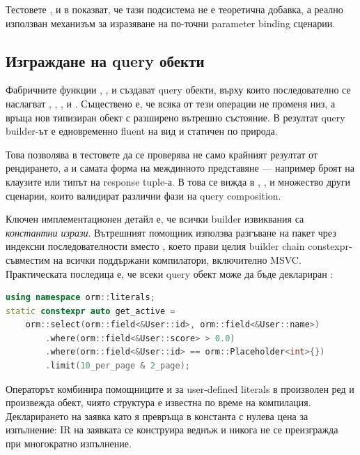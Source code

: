 Тестовете ,  и  в  показват, че тази подсистема не е теоретична добавка, а реално използван механизъм за изразяване на по-точни parameter binding сценарии.

\subsection{Изграждане на query обекти}

Фабричните функции , ,  и  създават query обекти, върху които последователно се наслагват , , ,  и . Съществено е, че всяка от тези операции не променя низ, а връща нов типизиран обект с разширено вътрешно състояние. В резултат query builder-ът е едновременно fluent на вид и статичен по природа.

Това позволява в тестовете да се проверява не само крайният резултат от рендирането, а и самата форма на междинното представяне --- например броят на  клаузите или типът на response tuple-а. В  това се вижда в , ,  и множество други сценарии, които валидират различни фази на query composition.

Ключен имплементационен детайл е, че всички builder извиквания са \emph{константни изрази}. Вътрешният помощник  използва разгъване на пакет чрез индексни последователности вместо , което прави целия builder chain constexpr-съвместим на всички поддържани компилатори, включително MSVC. Практическата последица е, че всеки query обект може да бъде деклариран :

\begin{lstlisting}[language=C++,caption={Query обект деклариран като compile-time константа},label={lst:constexpr_query}]
using namespace orm::literals;
static constexpr auto get_active =
    orm::select(orm::field<&User::id>, orm::field<&User::name>)
        .where(orm::field<&User::score> > 0.0)
        .where(orm::field<&User::id> == orm::Placeholder<int>{})
        .limit(10_per_page & 2_page);
\end{lstlisting}

Операторът \code{\&} комбинира помощниците  и  за user-defined literals в произволен ред и произвежда  обект, чиято структура е известна по време на компилация. Декларирането на заявка като  я превръща в константа с нулева цена за изпълнение: IR на заявката се конструира веднъж и никога не се преизгражда при многократно изпълнение.

